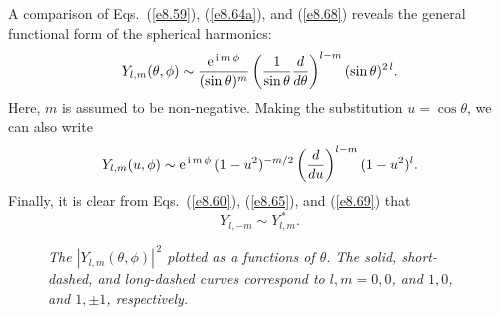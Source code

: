 A comparison of Eqs.~(\ref{e8.59}), (\ref{e8.64a}), and (\ref{e8.68})
reveals the general functional form of the spherical harmonics:
\begin{equation}
Y_{l,m}(\theta,\phi)\sim  \frac{{\rm e}^{\,{\rm i}\,m\,\phi}}{(\sin\theta)^m}\left(\frac{1}{\sin\theta}\frac{d}{d\theta}\right)^{l-m}
(\sin\theta)^{2\,l}.
\end{equation}
Here, $m$ is assumed to be non-negative. Making the substitution $u=\cos\theta$, we can also write
\begin{equation}
Y_{l,m}(u,\phi)\sim  {\rm e}^{\,{\rm i}\,m\,\phi}\,(1-u^2)^{-m/2}\left(\frac{d}{d u}\right)^{l-m}
(1-u^2)^l.
\end{equation}
Finally, it is clear from Eqs.~(\ref{e8.60}), (\ref{e8.65}), and (\ref{e8.69})
that
\begin{equation}
Y_{l,-m} \sim Y^{\,\ast}_{l,m}.
\end{equation}

\begin{figure}
\epsfysize=3in
\centerline{}
\caption{\em The $|Y_{l,m}(\theta,\phi)|^{\,2}$ plotted as a functions of $\theta$. The solid, short-dashed, and long-dashed curves correspond to 
$l,m=0,0$,  and $1,0$, and $1,\pm1$, respectively.}\label{ylm1}   
\end{figure}


